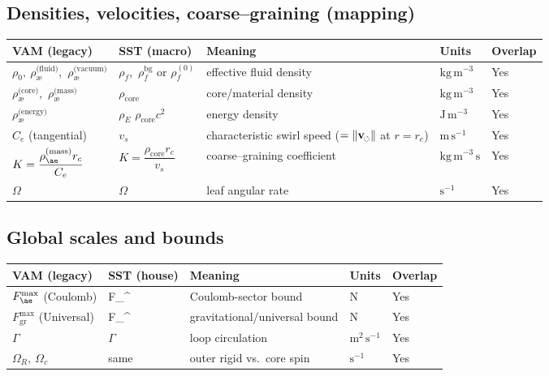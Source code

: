 \documentclass[11pt]{article}
\newcommand{\swirlarrow}{%
	\mathchoice{\mkern-2mu\scriptstyle\boldsymbol{\circlearrowleft}}%
	{\mkern-2mu\scriptstyle\boldsymbol{\circlearrowleft}}%
	{\mkern-2mu\scriptscriptstyle\boldsymbol{\circlearrowleft}}%
	{\mkern-2mu\scriptscriptstyle\boldsymbol{\circlearrowleft}}%
}
\newcommand{\vswirl}{\mathbf{v}_{\swirlarrow}}
\newcommand{\vscore}{v_s}                                %
\newcommand{\rhoF}{\rho_{\!f}}                           %
\newcommand{\rhoE}{\rho_{\!E}}                           %
\newcommand{\rhoC}{\rho_{\mathrm{core}}} %
\newcommand{\rs}{r_e}                                    %
\newcommand{\FmaxEM}{F_{\mathrm{EM}}^{\max}}             %
\newcommand{\FmaxG}{F_{\mathrm{G}}^{\max}}               %
\begin{document}
	\subsection*{Densities, velocities, coarse–graining (mapping)}
		\begin{center}
            \scriptsize
			\begin{tabular}{lllll}
				\hline
				\textbf{VAM (legacy)} & \textbf{SST (macro)} & \textbf{Meaning} & \textbf{Units} & \textbf{Overlap} \\
				\hline
				$\rho_0,\ \rho_{\text{\ae}}^{\text{(fluid)}}$,\ $\rho_{\text{\ae}}^{\text{(vacuum)}}$ & $\rhoF$,\ $\rhoF^{\mathrm{bg}}$ or $\rhoF^{(0)}$ & effective fluid density & $\mathrm{kg\,m^{-3}}$ & Yes \\
				$\rho_{\text{\ae}}^{\text{(core)}}$,\ 	$\rho_{\text{\ae}}^{\text{(mass)}}$  & $\rhoC$ & core/material density & $\mathrm{kg\,m^{-3}}$ & Yes \\
				$\rho_{\text{\ae}}^{\text{(energy)}}$ & $\rhoE$ \text{ (or } $\rhoC c^2$\text{)} & energy density & $\mathrm{J\,m^{-3}}$ & Yes \\
                $C_e$ (tangential) & $\vscore$ & characteristic swirl speed ($=\|\vswirl\|$ at $r=\rs$) & $\mathrm{m\,s^{-1}}$ & Yes \\
                $K=\dfrac{\rho_{\ae}^{(\text{mass})} r_c}{C_e}$ & $K=\dfrac{\rhoC r_c}{\vscore}$ & coarse–graining coefficient & $\mathrm{kg\,m^{-3}\,s}$ & Yes \\
				$\Omega$ & $\Omega$ & leaf angular rate & $\mathrm{s^{-1}}$ & Yes \\
				\hline
			\end{tabular}
		\end{center}

	\subsection*{Global scales and bounds}
		\begin{center}
			\begin{tabular}{lllll}
				\hline
				\textbf{VAM (legacy)} & \textbf{SST (house)} & \textbf{Meaning} & \textbf{Units} & \textbf{Overlap} \\
				\hline
				$F_{\ae}^{\max}$ (Coulomb) & \FmaxEM & Coulomb-sector bound & $\mathrm{N}$ & Yes \\
				$F_{\mathrm{gr}}^{\max}$ (Universal) & \FmaxG & gravitational/universal bound & $\mathrm{N}$ & Yes \\
				$\Gamma$ & $\Gamma$ & loop circulation & $\mathrm{m^{2}\,s^{-1}}$ & Yes \\
				$\Omega_R,\ \Omega_c$ & same & outer rigid vs.\ core spin & $\mathrm{s^{-1}}$ & Yes \\
				\hline
			\end{tabular}
		\end{center}
\end{document}
